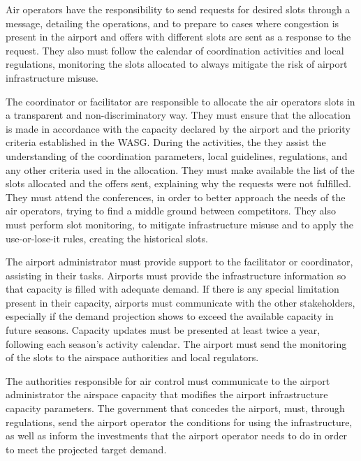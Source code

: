 %

Air operators have the responsibility to send requests for desired slots through a message, detailing the operations, and to prepare to cases where congestion is present in the airport and offers with different slots are sent as a response to the request. They also must follow the calendar of coordination activities and local regulations, monitoring the slots allocated to always mitigate the risk of airport infrastructure misuse.

The coordinator or facilitator are responsible to allocate the air operators slots in a transparent and non-discriminatory way. They must ensure that the allocation is made in accordance with the capacity declared by the airport and the priority criteria established in the \acrshort{WASG}. During the activities, the they assist the understanding of the coordination parameters, local guidelines, regulations, and any other criteria used in the allocation. They must make available the list of the slots allocated and the offers sent, explaining why the requests were not fulfilled. They must attend the conferences, in order to better approach the needs of the air operators, trying to find a middle ground between competitors. They also must perform slot monitoring, to mitigate infrastructure misuse and to apply the use-or-lose-it rules, creating the historical slots.

The airport administrator must provide support to the facilitator or coordinator, assisting in their tasks. Airports must provide the infrastructure information so that capacity is filled with adequate demand. If there is any special limitation present in their capacity, airports must communicate with the other stakeholders, especially if the demand projection shows to exceed the available capacity in future seasons. Capacity updates must be presented at least twice a year, following each season's activity calendar. The airport must send the monitoring of the slots to the airspace authorities and local regulators.

The authorities responsible for air control must communicate to the airport administrator the airspace capacity that modifies the airport infrastructure capacity parameters. The government that concedes the airport, must, through regulations, send the airport operator the conditions for using the infrastructure, as well as inform the investments that the airport operator needs to do in order to meet the projected target demand.

